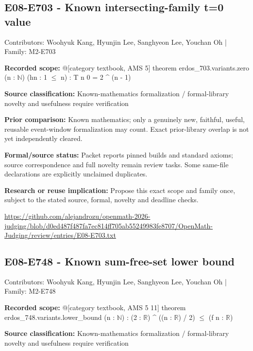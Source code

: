\documentclass[11pt,a4paper]{article}
\begin{document}
\begin{samepage}
\subsection{E08-E703  -  Known intersecting-family t=0 value}
{\small Contributors: Woohyuk Kang, Hyunjin Lee, Sanghyeon Lee, Youchan Oh | Family: M2-E703\par}

\textbf{Recorded scope:} @[category textbook, AMS 5] theorem erdos\_703.variants.zero (n : \ensuremath{\mathbb{N}}) (hn : 1 \ensuremath{\leq} n) : T n 0 = 2 \textasciicircum{} (n - 1)


\end{samepage}
\textbf{Source classification:} Known-mathematics formalization / formal-library novelty and usefulness require verification

\textbf{Prior comparison:} Known mathematics; only a genuinely new, faithful, useful, reusable event-window formalization may count. Exact prior-library overlap is not yet independently cleared.

\textbf{Formal/source status:} Packet reports pinned builds and standard axioms; source correspondence and full novelty remain review tasks. Some same-file declarations are explicitly unclaimed duplicates.

\textbf{Research or reuse implication:} Propose this exact scope and family once, subject to the stated source, formal, novelty and deadline checks.

{\small \url{https://github.com/alejandrozu/openmath-2026-judging/blob/d0ed487f487fa7ec814ff705ab55249983fe8707/OpenMath-Judging/review/entries/E08-E703.txt}\par}

\begin{samepage}
\subsection{E08-E748  -  Known sum-free-set lower bound}
{\small Contributors: Woohyuk Kang, Hyunjin Lee, Sanghyeon Lee, Youchan Oh | Family: M2-E748\par}

\textbf{Recorded scope:} @[category textbook, AMS 5 11] theorem erdos\_748.variants.lower\_bound (n : \ensuremath{\mathbb{N}}) : (2 : \ensuremath{\mathbb{R}}) \textasciicircum{} ((n : \ensuremath{\mathbb{R}}) / 2) \ensuremath{\leq} (f n : \ensuremath{\mathbb{R}})


\end{samepage}
\textbf{Source classification:} Known-mathematics formalization / formal-library novelty and usefulness require verification
\end{document}

